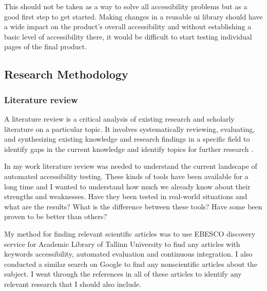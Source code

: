 \documentclass{master_thesis}
\begin{document}
This should not be taken as a way to solve all accessibility problems but as a good first step to get started. Making changes in a reusable \ac{ui} library should have a wide impact on the product's overall accessibility and without establishing a basic level of accessibility there, it would be difficult to start testing individual pages of the final product.

\subsection{Research Methodology}




\subsubsection{Literature review}

A literature review is a critical analysis of existing research and scholarly literature on a particular topic. It involves systematically reviewing, evaluating, and synthesizing existing knowledge and research findings in a specific field to identify gaps in the current knowledge and identify topics for further research \citep{Luft2022}.

In my work literature review was needed to understand the current landscape of automated accessibility testing. These kinds of tools have been available for a long time and I wanted to understand how much we already know about their strengths and weaknesses. Have they been tested in real-world situations and what are the results? What is the difference between these tools? Have some been proven to be better than others?

My method for finding relevant scientific articles was to use EBESCO discovery service for Academic Library of Tallinn University to find any articles with keywords accessibility, automated evaluation and continuous integration. I also conducted a similar search on Google to find any nonscientific articles about the subject. I went through the references in all of these articles to identify any relevant research that I should also include.
\end{document}
